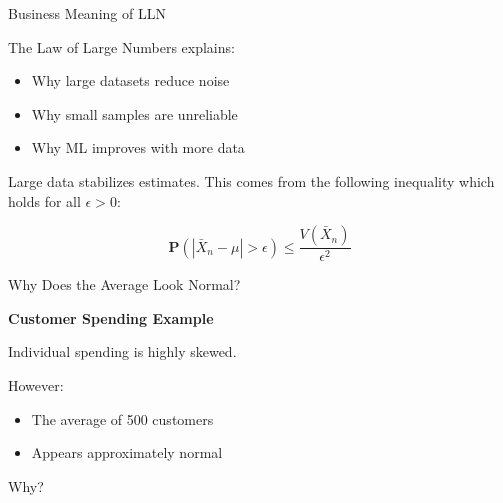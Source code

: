 \documentclass{beamer}
\begin{document}

\begin{frame}{Business Meaning of LLN}

The Law of Large Numbers explains:

\begin{itemize}
    \item Why large datasets reduce noise
    \item Why small samples are unreliable
    \item Why ML improves with more data
\end{itemize}

\vspace{0.5cm}

Large data stabilizes estimates. This comes from the following inequality which holds for all $\epsilon > 0$:

\[ \mathbf{P}(|\bar{X}_n - \mu| > \epsilon) \le \frac{V(\bar{X}_n)}{\epsilon^2} \]

\end{frame}

\begin{frame}{Why Does the Average Look Normal?}

\textbf{Customer Spending Example}

Individual spending is highly skewed.

\vspace{0.3cm}

\pause

However:

\begin{itemize}
    \item The average of 500 customers
    \item Appears approximately normal
\end{itemize}

\vspace{0.5cm}

Why?

\end{frame}
\end{document}
